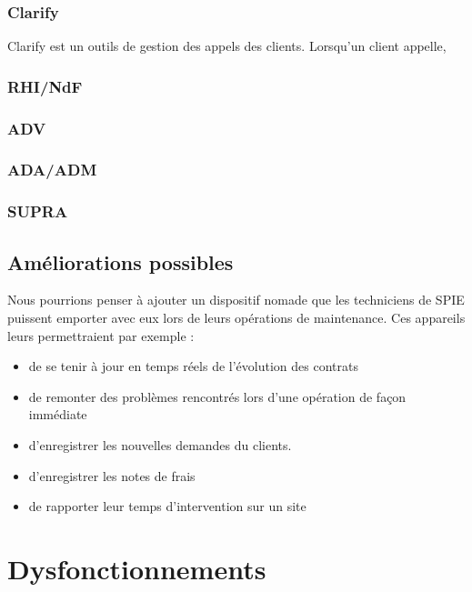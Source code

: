 \subsubsection{Clarify}

Clarify est un outils de gestion des appels des clients. Lorsqu'un client appelle,  %

\subsubsection{RHI/NdF}
\subsubsection{ADV}
\subsubsection{ADA/ADM}
\subsubsection{SUPRA}

\subsection{Améliorations possibles}

Nous pourrions penser à ajouter un dispositif nomade que les techniciens de SPIE puissent emporter avec eux lors de leurs opérations de maintenance. 
Ces appareils leurs permettraient par exemple :

\begin{itemize}
\item de se tenir à jour en temps réels de l'évolution des contrats
\item de remonter des problèmes rencontrés lors d'une opération de façon immédiate
\item d'enregistrer les nouvelles demandes du clients.
\item d'enregistrer les notes de frais
\item de rapporter leur temps d'intervention sur un site
\end{itemize}

\section{Dysfonctionnements}
